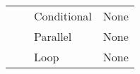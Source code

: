 \begin{table}[]
{\begin{tabular}{clll}
\multicolumn{1}{l|}{}                      &                                                      & Conditional                             & None                                                                                                                                                                                                                                                                                                                                      \\
\multicolumn{1}{l|}{}                      &                                                      & Parallel                                & None                                                                                                                                                                                                                                                                                                                                      \\
\multicolumn{1}{l|}{}                      &                                                      & Loop                                    & None                                                                                                                                                                                                                                                                                                                                      \\ \hline
\end{tabular}%
}
\end{table}